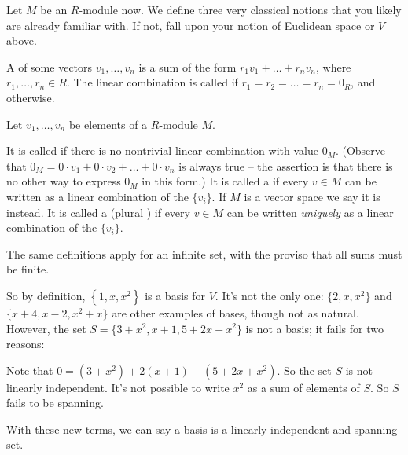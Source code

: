 Let $M$ be an $R$-module now.
We define three very classical notions that you likely are already familiar with.
If not, fall upon your notion of Euclidean space or $V$ above.
\begin{definition}
	A  of some vectors $v_1, \dots, v_n$
	is a sum of the form $r_1 v_1 + \dots + r_n v_n$,
	where $r_1, \dots, r_n \in R$.
	The linear combination is called 
	if $r_1 = r_2 = \dots = r_n = 0_R$, and  otherwise.
\end{definition}
\begin{definition}
	Let $v_1, \dots, v_n$ be elements of a $R$-module $M$.
	\begin{itemize}
		\ii It is called  if there
		is no nontrivial linear combination with value $0_M$.
		(Observe that $0_M = 0 \cdot v_1 + 0 \cdot v_2 + \dots + 0 \cdot v_n$
		is always true -- the assertion is that there is no other
		way to express $0_M$ in this form.)
		\ii It is called a  if every $v \in M$ can be written as
		a linear combination of the $\{v_i\}$.
		If $M$ is a vector space we say it is  instead.
		\ii It is called a  (plural )
		if every $v \in M$ can be written
		\emph{uniquely} as a linear combination of the $\{v_i\}$.
	\end{itemize}
	The same definitions apply for an infinite set, with the proviso
	that all sums must be finite.

\end{definition}
So by definition, $\left\{ 1,x,x^2 \right\}$ is a basis for $V$.
It's not the only one: $\{2, x, x^2\}$ and $\{x+4, x-2, x^2+x\}$
are other examples of bases, though not as natural.
However, the set $S = \{3+x^2, x+1, 5+2x+x^2\}$ is not a basis;
it fails for two reasons:
\begin{itemize}
	\ii Note that
	$0 = (3+x^2) + 2(x+1) - (5+2x+x^2)$.
	So the set $S$ is not linearly independent.
	\ii It's not possible to write $x^2$ as a sum of elements of $S$.
	So $S$ fails to be spanning.
\end{itemize}
With these new terms, we can say a basis is a linearly independent and spanning set.


